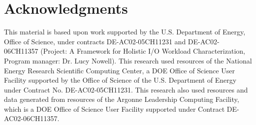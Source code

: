 \documentclass[sigconf,10pt]{acmart}
\begin{document}
\section*{Acknowledgments}
This material is based upon work supported by the U.S. Department of Energy, Office of Science, under contracts DE-AC02-05CH11231 and DE-AC02-06CH11357 (Project: A Framework for Holistic I/O Workload Characterization, Program manager: Dr. Lucy Nowell).
This research used resources of the National Energy Research Scientific Computing Center, a DOE Office of Science
User Facility supported by the Office of Science of the U.S. Department of Energy under Contract No. DE-AC02-05CH11231.
This research also used resources and data generated from resources of the Argonne Leadership Computing Facility, which is a DOE Office of Science User Facility supported under Contract DE-AC02-06CH11357.


%


% 

% 
\end{document}
